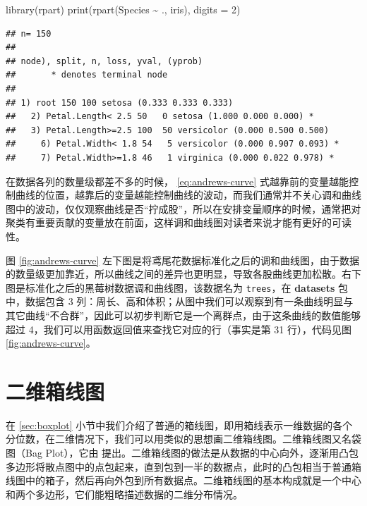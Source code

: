 \documentclass[
  b5paper,
  UTF8,twoside]{book}
\newenvironment{Shaded}{\begin{snugshade}}{\end{snugshade}}
\newcommand{\AttributeTok}[1]{\textcolor[rgb]{0.77,0.63,0.00}{#1}}
\newcommand{\DecValTok}[1]{\textcolor[rgb]{0.00,0.00,0.81}{#1}}
\newcommand{\FunctionTok}[1]{\textcolor[rgb]{0.00,0.00,0.00}{#1}}
\newcommand{\NormalTok}[1]{#1}
\newcommand{\SpecialCharTok}[1]{\textcolor[rgb]{0.00,0.00,0.00}{#1}}
\begin{document}
\begin{Shaded}
\begin{Highlighting}[]
\FunctionTok{library}\NormalTok{(rpart)}
\FunctionTok{print}\NormalTok{(}\FunctionTok{rpart}\NormalTok{(Species }\SpecialCharTok{\textasciitilde{}}\NormalTok{ ., iris), }\AttributeTok{digits =} \DecValTok{2}\NormalTok{)}
\end{Highlighting}
\end{Shaded}

\begin{verbatim}
## n= 150 
## 
## node), split, n, loss, yval, (yprob)
##       * denotes terminal node
## 
## 1) root 150 100 setosa (0.333 0.333 0.333)  
##   2) Petal.Length< 2.5 50   0 setosa (1.000 0.000 0.000) *
##   3) Petal.Length>=2.5 100  50 versicolor (0.000 0.500 0.500)  
##     6) Petal.Width< 1.8 54   5 versicolor (0.000 0.907 0.093) *
##     7) Petal.Width>=1.8 46   1 virginica (0.000 0.022 0.978) *
\end{verbatim}

在数据各列的数量级都差不多的时候， \eqref{eq:andrews-curve} 式越靠前的变量越能控制曲线的位置，越靠后的变量越能控制曲线的波动，而我们通常并不关心调和曲线图中的波动，仅仅观察曲线是否``拧成股''，所以在安排变量顺序的时候，通常把对聚类有重要贡献的变量放在前面，这样调和曲线图对读者来说才能有更好的可读性。

图 \ref{fig:andrews-curve}
左下图是将鸢尾花数据标准化之后的调和曲线图，由于数据的数量级更加靠近，所以曲线之间的差异也更明显，导致各股曲线更加松散。右下图是标准化之后的黑莓树数据调和曲线图，该数据名为 \texttt{trees}，在 \textbf{datasets} 包中，数据包含 3 列：周长、高和体积；从图中我们可以观察到有一条曲线明显与其它曲线``不合群''，因此可以初步判断它是一个离群点，由于这条曲线的数值能够超过 4，我们可以用函数返回值来查找它对应的行（事实是第 31 行），代码见图 \ref{fig:andrews-curve}。

\hypertarget{sec:bagplot}{%
\section{二维箱线图}\label{sec:bagplot}}

在 \ref{sec:boxplot} 小节中我们介绍了普通的箱线图，即用箱线表示一维数据的各个分位数，在二维情况下，我们可以用类似的思想画二维箱线图。二维箱线图又名袋图（Bag Plot），它由 \citet{Rousseeuw99} 提出。二维箱线图的做法是从数据的中心向外，逐渐用凸包多边形将散点图中的点包起来，直到包到一半的数据点，此时的凸包相当于普通箱线图中的箱子，然后再向外包到所有数据点。二维箱线图的基本构成就是一个中心和两个多边形，它们能粗略描述数据的二维分布情况。
\end{document}
